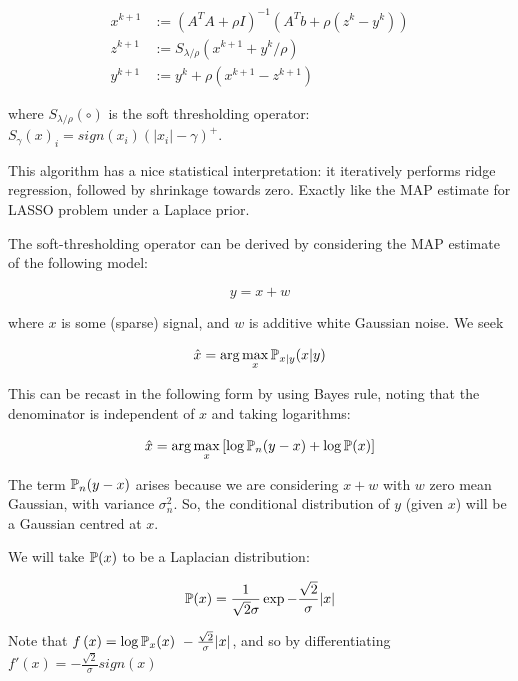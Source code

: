 \documentclass[conference]{IEEEtran}
\begin{document}
\begin{align}
x^{k+1} &:= \left(A^TA + \rho I\right)^{-1}\left(A^Tb +\rho\left(z^k - y^k\right)\right)\\
z^{k+1} &:= S_{\lambda/\rho}\left(x^{k+1} + y^k/\rho\right)
 \\
y^{k+1} &:= y^{k} + \rho \left(x^{k+1}-z^{k+1}\right)
\label{admm_algo_lasso}
\end{align}

where \(S_{\lambda/\rho}\left(\circ\right)\) is the soft thresholding operator: \(S_\gamma\left(x\right)_i = sign(x_i)\left(|x_i| - \gamma\right)^+\).

This algorithm has a nice statistical interpretation: it iteratively performs ridge regression, followed by shrinkage towards zero. Exactly like the MAP estimate for LASSO problem under a Laplace prior.

The soft-thresholding operator can be derived by considering the MAP estimate of the following model:

\begin{equation}
y = x + w
\end{equation}

where \(x\) is some (sparse) signal, and \(w\) is additive white Gaussian noise. We seek

\begin{equation}
\hat{x} = \arg\max_x {\mathbb{P}}_{x|y}{\left(x|y\right)}
\end{equation}

This can be recast in the following form by using Bayes rule, noting that the denominator is independent of \(x\) and taking logarithms:

\begin{equation}
\hat{x} = \arg\max_x \left[\log{\pr_{n}{\left(y-x\right)}}+\log{\pr{\left(x\right)}}\right]
\label{hatx}
\end{equation}

The term \({\mathbb{P}}_{n}{\left(y-x\right)}\) arises because we are considering \(x+w\) with \(w\) zero mean Gaussian, with variance \(\sigma_n^2\). So, the conditional distribution of \(y\) (given \(x\)) will be a Gaussian centred at \(x\).

We will take \({\mathbb{P}}{\left(x\right)}\) to be a Laplacian distribution:

\begin{equation}
{\mathbb{P}}{\left(x\right)} = \frac{1}{\sqrt{2}\sigma}\exp{-\frac{\sqrt{2}}{\sigma}|x|}
\end{equation}

Note that \( f\left(x\right) = \log{{\mathbb{P}}_x{ \left( x \right)}} ~ -\frac{\sqrt{2}}{\sigma} |x| \), and so by differentiating \( f'\left(x\right) = -\frac{\sqrt{2}}{\sigma} sign\left(x\right) \)
\end{document}
